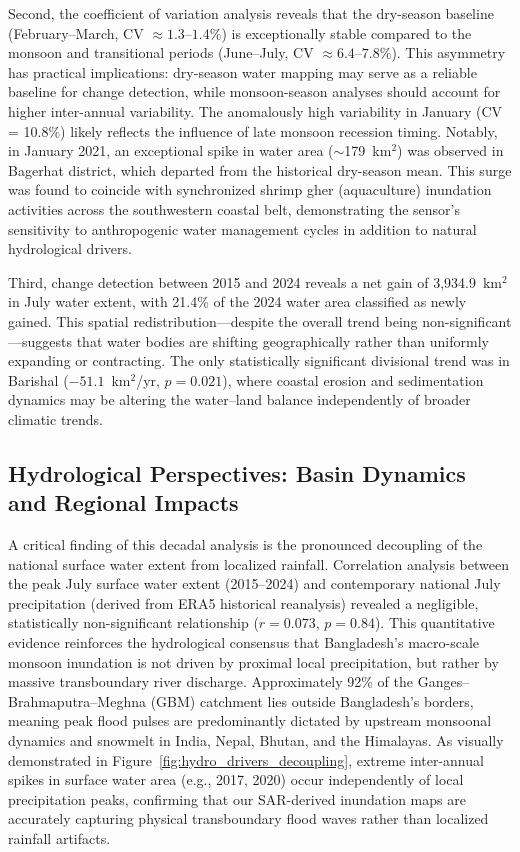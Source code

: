 \documentclass[fleqn,10pt]{article}
\begin{document}
Second, the coefficient of variation analysis reveals that the dry-season baseline (February--March, CV $\approx 1.3$--$1.4\%$) is exceptionally stable compared to the monsoon and transitional periods (June--July, CV $\approx 6.4$--$7.8\%$). This asymmetry has practical implications: dry-season water mapping may serve as a reliable baseline for change detection, while monsoon-season analyses should account for higher inter-annual variability. The anomalously high variability in January (CV = 10.8\%) likely reflects the influence of late monsoon recession timing. Notably, in January 2021, an exceptional spike in water area ($\sim$179~km$^2$) was observed in Bagerhat district, which departed from the historical dry-season mean. This surge was found to coincide with synchronized shrimp gher (aquaculture) inundation activities across the southwestern coastal belt, demonstrating the sensor's sensitivity to anthropogenic water management cycles in addition to natural hydrological drivers.

Third, change detection between 2015 and 2024 reveals a net gain of 3,934.9~km$^2$ in July water extent, with 21.4\% of the 2024 water area classified as newly gained. This spatial redistribution---despite the overall trend being non-significant---suggests that water bodies are shifting geographically rather than uniformly expanding or contracting. The only statistically significant divisional trend was in Barishal ($-51.1$~km$^2$/yr, $p = 0.021$), where coastal erosion and sedimentation dynamics may be altering the water--land balance independently of broader climatic trends.

\subsection{Hydrological Perspectives: Basin Dynamics and Regional Impacts}

A critical finding of this decadal analysis is the pronounced decoupling of the national surface water extent from localized rainfall. Correlation analysis between the peak July surface water extent (2015--2024) and contemporary national July precipitation (derived from ERA5 historical reanalysis) revealed a negligible, statistically non-significant relationship ($r = 0.073$, $p = 0.84$). This quantitative evidence reinforces the hydrological consensus that Bangladesh's macro-scale monsoon inundation is not driven by proximal local precipitation, but rather by massive transboundary river discharge. Approximately 92\% of the Ganges--Brahmaputra--Meghna (GBM) catchment lies outside Bangladesh's borders, meaning peak flood pulses are predominantly dictated by upstream monsoonal dynamics and snowmelt in India, Nepal, Bhutan, and the Himalayas. As visually demonstrated in Figure~\ref{fig:hydro_drivers_decoupling}, extreme inter-annual spikes in surface water area (e.g., 2017, 2020) occur independently of local precipitation peaks, confirming that our SAR-derived inundation maps are accurately capturing physical transboundary flood waves rather than localized rainfall artifacts.
\end{document}
